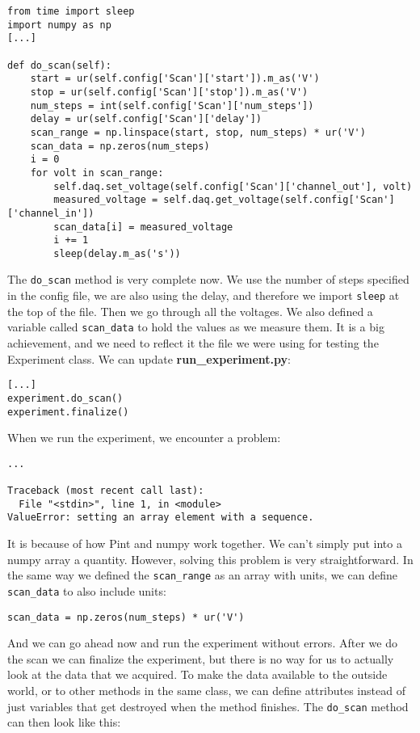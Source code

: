 \begin{verbatim}
from time import sleep
import numpy as np
[...]

def do_scan(self):
    start = ur(self.config['Scan']['start']).m_as('V')
    stop = ur(self.config['Scan']['stop']).m_as('V')
    num_steps = int(self.config['Scan']['num_steps'])
    delay = ur(self.config['Scan']['delay'])
    scan_range = np.linspace(start, stop, num_steps) * ur('V')
    scan_data = np.zeros(num_steps)
    i = 0
    for volt in scan_range:
        self.daq.set_voltage(self.config['Scan']['channel_out'], volt)
        measured_voltage = self.daq.get_voltage(self.config['Scan']['channel_in'])
        scan_data[i] = measured_voltage
        i += 1
        sleep(delay.m_as('s'))
\end{verbatim}

The \texttt{do\_scan} method is very complete now. We use the number of steps specified in the config file, we are also using the delay, and therefore we import \texttt{sleep} at the top of the file. Then we go through all the voltages. We also defined a variable called \texttt{scan\_data} to hold the values as we measure them. It is a big achievement, and we need to reflect it the file we were using for testing the Experiment class. We can update \textbf{run\_experiment.py}:

\begin{verbatim}
[...]
experiment.do_scan()
experiment.finalize()
\end{verbatim}

When we run the experiment, we encounter a problem:

\begin{verbatim}
...

Traceback (most recent call last):
  File "<stdin>", line 1, in <module>
ValueError: setting an array element with a sequence.
\end{verbatim}

It is because of how Pint and numpy work together. We can't simply put into a numpy array a quantity. However, solving this problem is very straightforward. In the same way we defined the \texttt{scan\_range} as an array with units, we can define \texttt{scan\_data} to also include units:

\begin{verbatim}
scan_data = np.zeros(num_steps) * ur('V')
\end{verbatim}

And we can go ahead now and run the experiment without errors. After we do the scan we can finalize the experiment, but there is no way for us to actually look at the data that we acquired. To make the data available to the outside world, or to other methods in the same class, we can define attributes instead of just variables that get destroyed when the method finishes. The \texttt{do\_scan} method can then look like this:


